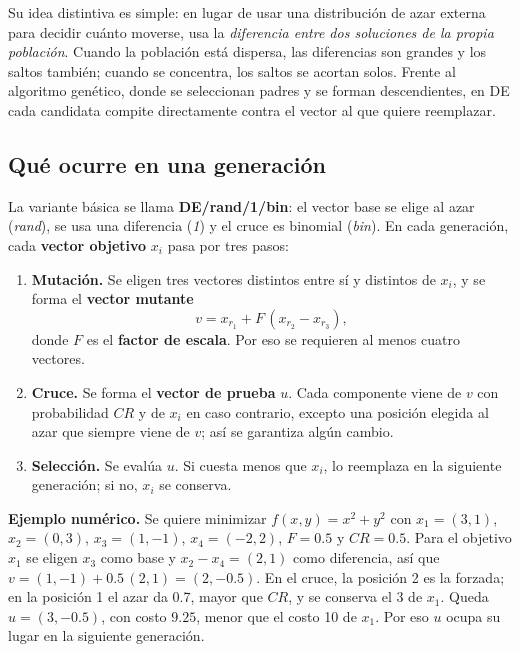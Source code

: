 \documentclass[letterpaper,12pt]{report}
\begin{document}
Su idea distintiva es simple: en lugar de usar una distribución de azar externa para decidir cuánto moverse, usa la \emph{diferencia entre dos soluciones de la propia población}. Cuando la población está dispersa, las diferencias son grandes y los saltos también; cuando se concentra, los saltos se acortan solos. Frente al algoritmo genético, donde se seleccionan padres y se forman descendientes, en DE cada candidata compite directamente contra el vector al que quiere reemplazar.

\subsection{Qué ocurre en una generación}
La variante básica se llama \textbf{DE/rand/1/bin}: el vector base se elige al azar (\emph{rand}), se usa una diferencia (\emph{1}) y el cruce es binomial (\emph{bin}). En cada generación, cada \textbf{vector objetivo} $x_i$ pasa por tres pasos:
\begin{enumerate}[leftmargin=*]
\item \textbf{Mutación.} Se eligen tres vectores distintos entre sí y distintos de $x_i$, y se forma el \textbf{vector mutante}
\begin{equation}
v=x_{r_1}+F\,(x_{r_2}-x_{r_3}),\label{eq:mut}
\end{equation}
donde $F$ es el \textbf{factor de escala}. Por eso se requieren al menos cuatro vectores.
\item \textbf{Cruce.} Se forma el \textbf{vector de prueba} $u$. Cada componente viene de $v$ con probabilidad $CR$ y de $x_i$ en caso contrario, excepto una posición elegida al azar que siempre viene de $v$; así se garantiza algún cambio.
\item \textbf{Selección.} Se evalúa $u$. Si cuesta menos que $x_i$, lo reemplaza en la siguiente generación; si no, $x_i$ se conserva.
\end{enumerate}

\textbf{Ejemplo numérico.} Se quiere minimizar $f(x,y)=x^2+y^2$ con $x_1=(3,1)$, $x_2=(0,3)$, $x_3=(1,-1)$, $x_4=(-2,2)$, $F=0.5$ y $CR=0.5$. Para el objetivo $x_1$ se eligen $x_3$ como base y $x_2-x_4=(2,1)$ como diferencia, así que $v=(1,-1)+0.5\,(2,1)=(2,-0.5)$. En el cruce, la posición 2 es la forzada; en la posición 1 el azar da 0.7, mayor que $CR$, y se conserva el 3 de $x_1$. Queda $u=(3,-0.5)$, con costo $9.25$, menor que el costo 10 de $x_1$. Por eso $u$ ocupa su lugar en la siguiente generación.
\end{document}
